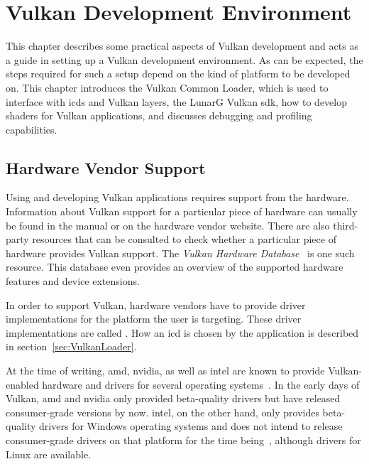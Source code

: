 
\chapter{Vulkan Development Environment}
\label{cha:EnvSetup}



  This chapter describes some practical aspects of Vulkan development and acts as a guide in setting up a Vulkan development environment.
  As can be expected, the steps required for such a setup depend on the kind of platform to be developed on.
  This chapter introduces the Vulkan Common Loader, which is used to interface with \glspl{icd} and Vulkan layers, the LunarG Vulkan \gls{sdk}, how to develop shaders for Vulkan applications, and discusses debugging and profiling capabilities.

  \section{Hardware Vendor Support}
  \label{sec:HardwareVendorSupport}
    Using and developing Vulkan applications requires support from the hardware.
    Information about Vulkan support for a particular piece of hardware can usually be found in the manual or on the hardware vendor website.
    There are also third-party resources that can be consulted to check whether a particular piece of hardware provides Vulkan support.
    The \textit{Vulkan Hardware Database}~\cite{vulkangpuinfo} is one such resource.
    This database even provides an overview of the supported hardware features and device extensions.

    In order to support Vulkan, hardware vendors have to provide driver implementations for the platform the user is targeting.
    These driver implementations are called .
    How an \gls{icd} is chosen by the application is described in section~\ref{sec:VulkanLoader}.

    At the time of writing, \gls{amd}, \gls{nvidia}, as well as \gls{intel} are known to provide Vulkan-enabled hardware and drivers for several operating systems~\cite{practicalvkgdc16}.
    In the early days of Vulkan, \gls{amd} and \gls{nvidia} only provided beta-quality \glspl{driver} but have released consumer-grade versions by now.
    \gls{intel}, on the other hand, only provides beta-quality \glspl{driver} for Windows operating systems and does not intend to release consumer-grade \glspl{driver} on that platform for the time being~\cite{intelvulkandriversonwindows}, although drivers for Linux are available.

